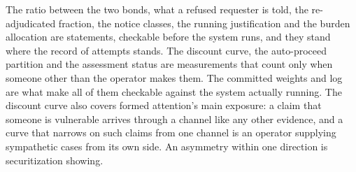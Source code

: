 The ratio between the two bonds, what a refused requester is told, the re-adjudicated fraction, the notice classes, the running justification and the burden allocation are statements, checkable before the system runs, and they stand where the record of attempts stands. The discount curve, the auto-proceed partition and the assessment status are measurements that count only when someone other than the operator makes them. The committed weights and log are what make all of them checkable against the system actually running. The discount curve also covers formed attention's main exposure: a claim that someone is vulnerable arrives through a channel like any other evidence, and a curve that narrows on such claims from one channel is an operator supplying sympathetic cases from its own side. An asymmetry within one direction is securitization showing.

